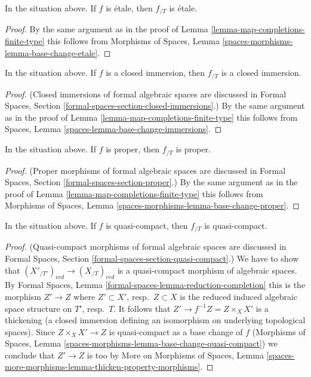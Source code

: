 \begin{lemma}
\label{lemma-map-completions-etale}
In the situation above. If $f$ is \'etale, then $f_{/T}$ is \'etale.
\end{lemma}

\begin{proof}
By the same argument as in the proof of
Lemma \ref{lemma-map-completions-finite-type} this follows from
Morphisms of Spaces, Lemma \ref{spaces-morphisms-lemma-base-change-etale}.
\end{proof}

\begin{lemma}
\label{lemma-closed-immersion-gives-closed-immersion}
In the situation above. If $f$ is a closed immersion, then
$f_{/T}$ is a closed immersion.
\end{lemma}

\begin{proof}
(Closed immersions of formal algebraic spaces are discussed in
Formal Spaces, Section
\ref{formal-spaces-section-closed-immersions}.)
By the same argument as in the proof of
Lemma \ref{lemma-map-completions-finite-type} this follows from
Spaces, Lemma
\ref{spaces-lemma-base-change-immersions}.
\end{proof}

\begin{lemma}
\label{lemma-proper-gives-proper}
In the situation above. If $f$ is proper, then $f_{/T}$ is proper.
\end{lemma}

\begin{proof}
(Proper morphisms of formal algebraic spaces are discussed in
Formal Spaces, Section \ref{formal-spaces-section-proper}.)
By the same argument as in the proof of
Lemma \ref{lemma-map-completions-finite-type} this follows from
Morphisms of Spaces, Lemma
\ref{spaces-morphisms-lemma-base-change-proper}.
\end{proof}

\begin{lemma}
\label{lemma-quasi-compact-gives-quasi-compact}
In the situation above. If $f$ is quasi-compact, then
$f_{/T}$ is quasi-compact.
\end{lemma}

\begin{proof}
(Quasi-compact morphisms of formal algebraic spaces are discussed in
Formal Spaces, Section \ref{formal-spaces-section-quasi-compact}.)
We have to show that $(X'_{/T'})_{red} \to (X_{/T})_{red}$ is a quasi-compact
morphism of algebraic spaces. By
Formal Spaces, Lemma \ref{formal-spaces-lemma-reduction-completion}
this is the morphism $Z' \to Z$ where $Z' \subset X'$, resp.\ $Z \subset X$
is the reduced induced algebraic space structure on $T'$, resp.\ $T$.
It follows that $Z' \to f^{-1}Z = Z \times_X X'$ is a thickening (a closed
immersion defining an isomorphism on underlying topological spaces).
Since $Z \times_X X' \to Z$ is quasi-compact as a base change of $f$
(Morphisms of Spaces, Lemma
\ref{spaces-morphisms-lemma-base-change-quasi-compact})
we conclude that $Z' \to Z$ is too by
More on Morphisms of Spaces, Lemma
\ref{spaces-more-morphisms-lemma-thicken-property-morphisms}.
\end{proof}

